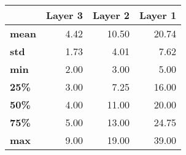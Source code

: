 \begin{tabular}{lrrr}
\toprule
{} &  Layer 3 &  Layer 2 &  Layer 1 \\
\midrule
\textbf{mean} &     4.42 &    10.50 &    20.74 \\
\textbf{std } &     1.73 &     4.01 &     7.62 \\
\textbf{min } &     2.00 &     3.00 &     5.00 \\
\textbf{25\% } &     3.00 &     7.25 &    16.00 \\
\textbf{50\% } &     4.00 &    11.00 &    20.00 \\
\textbf{75\% } &     5.00 &    13.00 &    24.75 \\
\textbf{max } &     9.00 &    19.00 &    39.00 \\
\bottomrule
\end{tabular}
